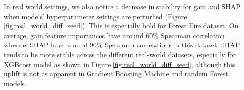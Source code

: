 In real world settings, we also notice a decrease in stability for gain and SHAP when models' hyperparameter settings are perturbed (Figure \ref{fig:real_world_diff_seed}). This is especially bold for Forest Fire dataset. On average, gain feature importances have around 60\% Spearman correlation whereas SHAP have around 90\% Spearman correlations in this dataset. %
SHAP tends to be more stable across the different real-world datasets, especially for XGBoost model as shown in Figure \ref{fig:real_world_diff_seed}, although this uplift is not as apparent in Gradient Boosting Machine and random Forest models.



